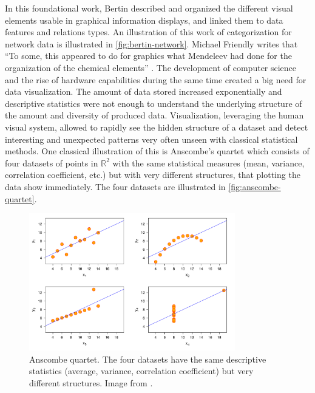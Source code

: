 In this foundational work, Bertin described and organized the different visual elements usable in graphical information displays, and linked them to data features and relations types.
An illustration of this work of categorization for network data is illustrated in \autoref{fig:bertin-network}.
Michael Friendly writes that ``To some, this appeared to do for graphics what Mendeleev had done for the organization of the chemical elements'' \cite{friendlyBriefHistoryData2008}.
The development of computer science and the rise of hardware capabilities during the same time created a big need for data visualization.
The amount of data stored increased exponentially \cite{hilbertWorldTechnologicalCapacity2011} and descriptive statistics were not enough to understand the underlying structure of the amount and diversity of produced data.
Visualization, leveraging the human visual system, allowed to rapidly see the hidden structure of a dataset and detect interesting and unexpected patterns very often unseen with classical statistical methods.
One classical illustration of this is Anscombe's quartet\cite{anscombeGraphsStatisticalAnalysis1973} which consists of four datasets of points in $\mathbb{R} ^{2}$ with the same statistical measures (mean, variance, correlation coefficient, etc.) but with very different structures, that plotting the data show immediately.
The four datasets are illustrated in \autoref{fig:anscombe-quartet}.

\begin{figure}
    \centering %
    \includegraphics[width=0.8\textwidth]{static/figures/RelatedWork/Anscombe.pdf}
    \caption{Anscombe quartet. The four datasets have the same descriptive statistics (average, variance, correlation coefficient) but very different structures. Image from \cite{anscombeGraphsStatisticalAnalysis1973}.}
    \label{fig:anscombe-quartet}
\end{figure}

